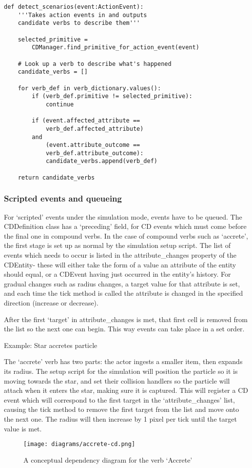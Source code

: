 \documentclass[dissertation.tex]{subfiles}
\begin{document}
\begin{lstlisting}[frame=single,caption={CDManager.detect\_scenarios method}]
def detect_scenarios(event:ActionEvent):
    '''Takes action events in and outputs
    candidate verbs to describe them'''
    
    selected_primitive =
        CDManager.find_primitive_for_action_event(event)            

    # Look up a verb to describe what's happened
    candidate_verbs = []

    for verb_def in verb_dictionary.values():
        if (verb_def.primitive != selected_primitive):
            continue

        if (event.affected_attribute ==
            verb_def.affected_attribute)
        and
            (event.attribute_outcome ==
            verb_def.attribute_outcome):
            candidate_verbs.append(verb_def)
    
    return candidate_verbs
\end{lstlisting}

    \subsubsection{Scripted events and queueing}
    For `scripted' events under the simulation mode, events have to be queued. The CDDefinition class has a `preceding' field, for CD events which must come before the final one in compound verbs. In the case of compound verbs such as `accrete', the first stage is set up as normal by the simulation setup script. The list of events which needs to occur is listed in the attribute\_changes property of the CDEntity- these will either take the form of a value an attribute of the entity should equal, or a CDEvent having just occurred in the entity's history. For gradual changes such as radius changes, a target value for that attribute is set, and each time the tick method is called the attribute is changed in the specified direction (increase or decrease).

    After the first `target' in attribute\_changes is met, that first cell is removed from the list so the next one can begin. This way events can take place in a set order.

    Example: Star accretes particle

    The `accrete' verb has two parts: the actor ingests a smaller item, then expands its radius. The setup script for the simulation will position the particle so it is moving towards the star, and set their collision handlers so the particle will attach when it enters the star, making sure it is captured. This will register a CD event which will correspond to the first target in the `attribute\_changes' list, causing the tick method to remove the first target from the list and move onto the next one. The radius will then increase by 1 pixel per tick until the target value is met.

    \begin{figure}[h]
        \begin{center}        
            \texttt{[image: diagrams/accrete-cd.png]}
        \end{center}
        \caption{A conceptual dependency diagram for the verb `Accrete'}
    \end{figure}




\end{document}
